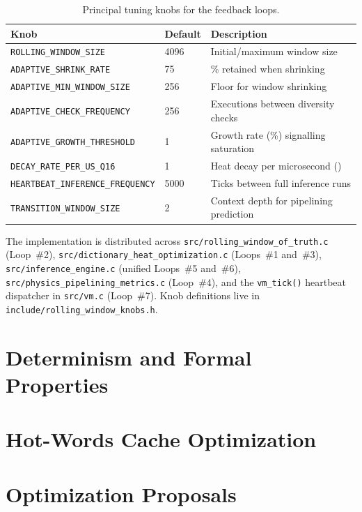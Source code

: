 \begin{table}[ht]
\centering
\small
\begin{tabular}{lll}
\toprule
Knob & Default & Description \\
\midrule
\texttt{ROLLING\_WINDOW\_SIZE}            & 4096 & Initial/maximum window size \\
\texttt{ADAPTIVE\_SHRINK\_RATE}           & 75   & \% retained when shrinking \\
\texttt{ADAPTIVE\_MIN\_WINDOW\_SIZE}      & 256  & Floor for window shrinking \\
\texttt{ADAPTIVE\_CHECK\_FREQUENCY}       & 256  & Executions between diversity checks \\
\texttt{ADAPTIVE\_GROWTH\_THRESHOLD}      & 1    & Growth rate (\%) signalling saturation \\
\texttt{DECAY\_RATE\_PER\_US\_Q16}        & 1    & Heat decay per microsecond (\Qtype{}) \\
\texttt{HEARTBEAT\_INFERENCE\_FREQUENCY}  & 5000 & Ticks between full inference runs \\
\texttt{TRANSITION\_WINDOW\_SIZE}         & 2    & Context depth for pipelining prediction \\
\bottomrule
\end{tabular}
\caption{Principal tuning knobs for the feedback loops.}
\label{vol1:tab:physics:knobs}
\end{table}

The implementation is distributed across
\texttt{src/rolling\_window\_of\_truth.c} (Loop~\#2),
\texttt{src/dictionary\_heat\_optimization.c} (Loops~\#1 and~\#3),
\texttt{src/inference\_engine.c} (unified Loops~\#5 and~\#6),
\texttt{src/physics\_pipelining\_metrics.c} (Loop~\#4), and the
\texttt{vm\_tick()} heartbeat dispatcher in \texttt{src/vm.c} (Loop~\#7).
Knob definitions live in \texttt{include/rolling\_window\_knobs.h}.

\section{Determinism and Formal Properties}
\label{vol1:sec:physics:determinism}


\section{Hot-Words Cache Optimization}
\label{vol1:sec:physics:hotwords}



\section{Optimization Proposals}
\label{vol1:sec:physics:proposals}


